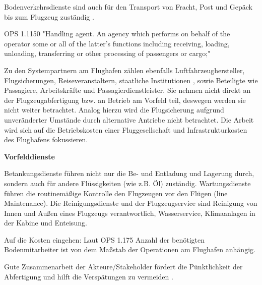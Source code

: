 Bodenverkehrsdienste sind auch für den Transport von Fracht, Post und Gepäck bis zum Flugzeug zuständig \cite{mensen2013handbuch}.

OPS 1.1150 "Handling agent. An agency which performs on behalf of the operator some or all of the latter's functions
including receiving, loading, unloading, transferring or other processing of passengers or cargo;"


Zu den Systempartnern am Flughafen zählen ebenfalls Luftfahrzeughersteller, Flugsicherungen, Reiseveranstaltern, staatliche Institutionen \cite{maertens2023neue},
sowie Beteiligte wie Passagiere, Arbeitskräfte und Passagierdienstleister. 
Sie nehmen nicht direkt an der Flugzeugabfertigung bzw. an Betrieb am Vorfeld teil, deswegen werden sie nicht weiter betrachtet.
Analog hierzu wird die Flugsicherung aufgrund unveränderter Umstände durch alternative Antriebe nicht betrachtet. 
Die Arbeit wird sich auf die Betriebskosten einer Fluggesellschaft und Infrastrukturkosten des Flughafens fokussieren.


\textbf{Vorfelddienste}

Betankungsdienste führen nicht nur die Be- und Entladung und Lagerung durch, sondern auch für andere Flüssigkeiten (wie z.B. Öl) zuständig.
Wartungsdienste führen die routinemäßige Kontrolle den Flugzeugen vor den Flügen (line Maintenance).
Die Reinigungsdienste und der Flugzeugservice sind Reinigung von Innen und Außen eines Flugzeugs verantwortlich, Wasserservice, 
Klimaanlagen in der Kabine und Enteisung.


Auf die Kosten eingehen:
Laut OPS 1.175 %
Anzahl der benötigten Bodenmitarbeiter ist von dem Maßstab der Operationen am Flughafen anhängig.


Gute Zusammenarbeit der Akteure/Stakeholder fördert die Pünktlichkeit der Abfertigung und hilft die 
Verspätungen zu vermeiden \cite{schmidt2016challenges}.

